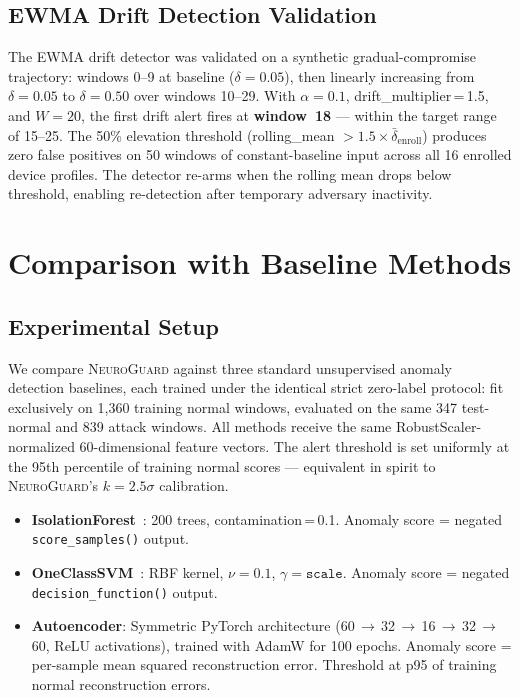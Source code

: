 \documentclass[journal,10pt,twoside]{IEEEtran}
\newcommand{\neuroguard}{\textsc{NeuroGuard}}
\begin{document}
\subsection{EWMA Drift Detection Validation}

The EWMA drift detector was validated on a synthetic gradual-compromise
trajectory: windows 0--9 at baseline ($\delta=0.05$), then linearly
increasing from $\delta=0.05$ to $\delta=0.50$ over windows 10--29.
With $\alpha=0.1$, drift\_multiplier\,=\,1.5, and $W=20$, the first drift
alert fires at \textbf{window~18} --- within the target range of 15--25.
The 50\% elevation threshold (rolling\_mean $> 1.5\times\bar{\delta}_{\text{enroll}}$)
produces zero false positives on 50 windows of constant-baseline input across
all 16 enrolled device profiles.
The detector re-arms when the rolling mean drops below threshold, enabling
re-detection after temporary adversary inactivity.

\section{Comparison with Baseline Methods}
\label{sec:baselines}

\subsection{Experimental Setup}

We compare \neuroguard{} against three standard unsupervised anomaly detection
baselines, each trained under the identical strict zero-label protocol: fit
exclusively on 1{,}360 training normal windows, evaluated on the same 347
test-normal and 839 attack windows.
All methods receive the same RobustScaler-normalized 60-dimensional feature
vectors.
The alert threshold is set uniformly at the 95th percentile of training normal
scores --- equivalent in spirit to \neuroguard{}'s $k=2.5\sigma$ calibration.

\begin{itemize}
  \item \textbf{IsolationForest}~\cite{liu2008iforest}: 200 trees,
    contamination\,=\,0.1.
    Anomaly score = negated \texttt{score\_samples()} output.

  \item \textbf{OneClassSVM}~\cite{scholkopf1999ocsvm}: RBF kernel,
    $\nu=0.1$, $\gamma=\texttt{scale}$.
    Anomaly score = negated \texttt{decision\_function()} output.

  \item \textbf{Autoencoder}: Symmetric PyTorch architecture
    (60\,$\to$\,32\,$\to$\,16\,$\to$\,32\,$\to$\,60, ReLU activations),
    trained with AdamW for 100 epochs.
    Anomaly score = per-sample mean squared reconstruction error.
    Threshold at p95 of training normal reconstruction errors.
\end{itemize}
\end{document}
